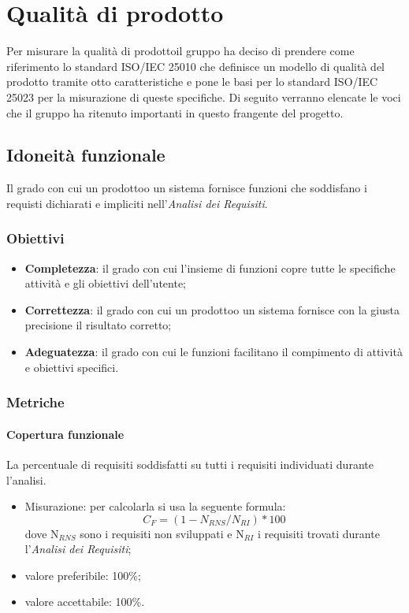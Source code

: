 \section{Qualità di prodotto}
    Per misurare la qualità di prodotto\glosp il gruppo ha deciso di prendere come riferimento lo standard ISO/IEC 25010 che definisce un modello di qualità del prodotto tramite otto caratteristiche e pone le basi per lo standard ISO/IEC 25023 per la misurazione di queste specifiche. Di seguito verranno elencate le voci che il gruppo ha ritenuto importanti in questo frangente del progetto\glo.
    \subsection{Idoneità funzionale}
        Il grado con cui un prodotto\glosp o un sistema fornisce funzioni che soddisfano i requisti dichiarati e impliciti nell'\textit{Analisi dei Requisiti}.
        \subsubsection{Obiettivi}
            \begin{itemize}
                \item \textbf{Completezza}: il grado con cui l'insieme di funzioni copre tutte le specifiche attività e gli obiettivi dell'utente;
                \item \textbf{Correttezza}: il grado con cui un prodotto\glosp o un sistema fornisce con la giusta precisione il risultato corretto;
                \item \textbf{Adeguatezza}: il grado con cui le funzioni facilitano il compimento di attività e obiettivi specifici.
            \end{itemize}
        \subsubsection{Metriche}
            \paragraph{Copertura funzionale}
                La percentuale di requisiti soddisfatti su tutti i requisiti individuati durante l'analisi.
                \begin{itemize}
                    \item Misurazione: per calcolarla si usa la seguente formula: 
                    \[C_F=(1-N_{RNS}/N_{RI})*100\]
                    dove N$_{RNS}$ sono i requisiti non sviluppati e N$_{RI}$ i requisiti trovati durante l'\textit{Analisi dei Requisiti};
                    \item valore preferibile: 100\%;
                    \item valore accettabile: 100\%.
                \end{itemize}
